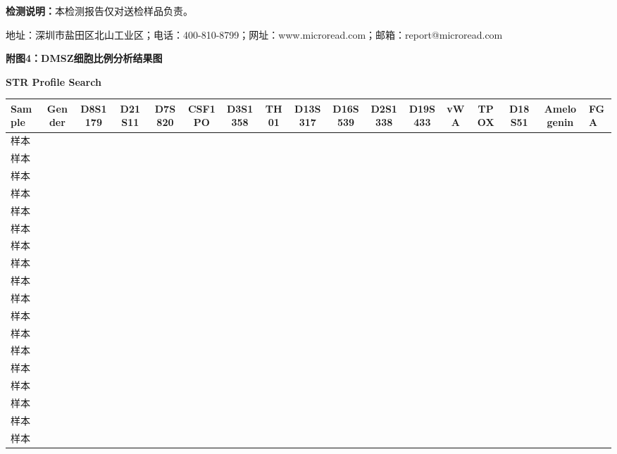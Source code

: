 \documentclass[UTF8,10pt,a4paper,fontset=fandol]{ctexart}
\begin{document}
\noindent
\textbf{检测说明：}本检测报告仅对送检样品负责。

\noindent
地址：深圳市盐田区北山工业区；电话：400-810-8799；网址：www.microread.com；邮箱：report@microread.com

\newpage

\begin{center}
\textbf{附图4：DMSZ细胞比例分析结果图}

\vspace{0.5em}

\textbf{STR Profile Search}

\small
\begin{tabular}{|p{2.2cm}|c|c|c|c|c|c|c|c|c|c|c|c|c|c|c|}
\hline
Sample & Gender & D8S1179 & D21S11 & D7S820 & CSF1PO & D3S1358 &
TH01 & D13S317 & D16S539 & D2S1338 & D19S433 & vWA & TPOX &
D18S51 & Amelogenin & FGA \\
\hline
样本 &  &  &  &  &  &  &  &  &  &  &  &  &  &  &  &  \\
\hline
样本 &  &  &  &  &  &  &  &  &  &  &  &  &  &  &  &  \\
\hline
样本 &  &  &  &  &  &  &  &  &  &  &  &  &  &  &  &  \\
\hline
样本 &  &  &  &  &  &  &  &  &  &  &  &  &  &  &  &  \\
\hline
样本 &  &  &  &  &  &  &  &  &  &  &  &  &  &  &  &  \\
\hline
样本 &  &  &  &  &  &  &  &  &  &  &  &  &  &  &  &  \\
\hline
样本 &  &  &  &  &  &  &  &  &  &  &  &  &  &  &  &  \\
\hline
样本 &  &  &  &  &  &  &  &  &  &  &  &  &  &  &  &  \\
\hline
样本 &  &  &  &  &  &  &  &  &  &  &  &  &  &  &  &  \\
\hline
样本 &  &  &  &  &  &  &  &  &  &  &  &  &  &  &  &  \\
\hline
样本 &  &  &  &  &  &  &  &  &  &  &  &  &  &  &  &  \\
\hline
样本 &  &  &  &  &  &  &  &  &  &  &  &  &  &  &  &  \\
\hline
样本 &  &  &  &  &  &  &  &  &  &  &  &  &  &  &  &  \\
\hline
样本 &  &  &  &  &  &  &  &  &  &  &  &  &  &  &  &  \\
\hline
样本 &  &  &  &  &  &  &  &  &  &  &  &  &  &  &  &  \\
\hline
样本 &  &  &  &  &  &  &  &  &  &  &  &  &  &  &  &  \\
\hline
样本 &  &  &  &  &  &  &  &  &  &  &  &  &  &  &  &  \\
\hline
样本 &  &  &  &  &  &  &  &  &  &  &  &  &  &  &  &  \\
\hline
\end{tabular}
\end{center}
\end{document}
